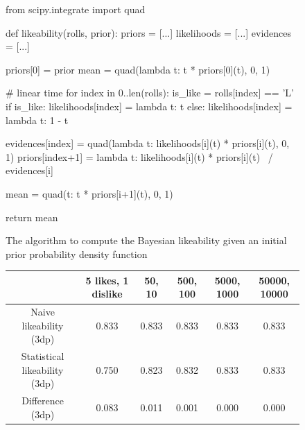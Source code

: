 \documentclass[a4paper,11pt]{article}
\begin{document}
\begin{figure}[H]
    \begin{pythonln}
from scipy.integrate import quad

def likeability(rolls, prior):
    priors = [...]
    likelihoods = [...]
    evidences = [...]

    priors[0] = prior
    mean = quad(lambda t: t * priors[0](t), 0, 1)

    # linear time
    for index in 0..len(rolls):
        is_like = rolls[index] == 'L'
        if is_like:
            likelihoods[index] = lambda t: t
        else:
            likelihoods[index] = lambda t: 1 - t

        evidences[index] = quad(lambda t: likelihoods[i](t) * priors[i](t),
                               0, 1)
        priors[index+1] = lambda t: likelihoods[i](t) * priors[i](t) \
                                / evidences[i]

        mean = quad(t: t * priors[i+1](t), 0, 1)

    return mean
    \end{pythonln}
    \caption{The algorithm to compute the Bayesian likeability given an initial prior probability density function}
    \label{apd:algo}
\end{figure}

\begin{figure}[H]
    \centering
    \begin{tabular}{c|c|c|c|c|c}
        & 5 likes, 1 dislike & 50, 10 & 500, 100 & 5000, 1000 & 50000, 10000 \\
        \hline
        \hline
        Naive likeability (3dp) & 0.833 & 0.833 & 0.833 & 0.833 & 0.833\\ \hline
        Statistical likeability (3dp) & 0.750 & 0.823 & 0.832 & 0.833 & 0.833\\ \hline
        Difference (3dp) & 0.083 & 0.011 & 0.001 & 0.000 & 0.000
    \end{tabular}
    \label{apd:acc}
\end{figure}
\end{document}
